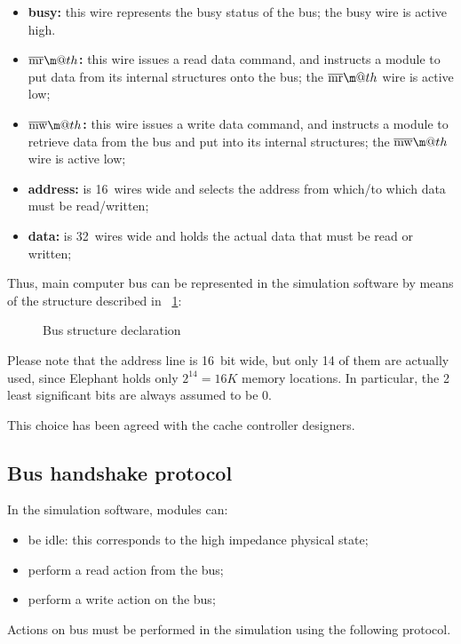 \documentclass[a4paper,12pt]{article}
\makeatletter
\newcommand*{\textoverline}[1]{$\overline{\hbox{#1}}\m@th$}
\newcommand{\memoryname}{Elephant}
\makeatother
\begin{document}
\begin{itemize}
  \item \textbf{busy:} this wire represents the busy status of the bus; the busy wire is active high.
  \item \textbf{\textoverline{mr}:} this wire issues a read data command, and instructs a module to put data from its internal structures onto the bus; the \textoverline{mr} wire is active low;
  \item \textbf{\textoverline{mw}:} this wire issues a write data command, and instructs a module to retrieve data from the bus and put into its internal structures; the \textoverline{mw} wire is active low;
  \item \textbf{address:} is 16~wires wide and selects the address from which/to which data must be read/written;
  \item \textbf{data:} is 32~wires wide and holds the actual data that must be read or written;
\end{itemize}

Thus, main computer bus can be represented in the simulation software by means of the structure described in \figurename~\ref{src:bus-h}:

\begin{figure}

\caption{Bus structure declaration}
\label{src:bus-h}
\end{figure}

Please note that the address line is 16~bit wide, but only 14 of them are actually used, since \memoryname{} holds only $2^{14} = 16K$ memory locations.
In particular, the 2 least significant bits are always assumed to be 0.

This choice has been agreed with the cache controller designers.

\subsection{Bus handshake protocol}
In the simulation software, modules can:
\begin{itemize}
  \item be idle: this corresponds to the high impedance physical state;
  \item perform a read action from the bus;
  \item perform a write action on the bus;
\end{itemize}

Actions on bus must be performed in the simulation using the following protocol.
\end{document}
